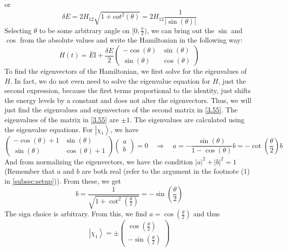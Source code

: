 \documentclass[12pt,a4paper]{article}
\begin{document}
	or
	\begin{equation}
		\delta E = 2H_{12} \sqrt{1 + cot^{2}(\theta)} = 2H_{12} \dfrac{1}{\left| \sin(\theta) \right|}
	\end{equation}
	Selecting $\theta$ to be some arbitrary angle on $[0, \frac{\pi}{2})$, we can bring out the $\sin$ and $\cos$ from the absolute values and write the Hamiltonian in the following way:
	\begin{equation}
		H(t) = \bar{E} \mathbb{I} + \dfrac{\delta E}{2}
		\begin{pmatrix}
			-\cos(\theta) & \sin(\theta) \\
			\sin(\theta) & \cos(\theta)
		\end{pmatrix} \label{3.55}
	\end{equation}
	To find the eigenvectors of the Hamiltonian, we first solve for the eigenvalues of $H$. In fact, we do not even need to solve the eigenvalue equation for $H$, just the second expression, because the first terms proportional to the identity, just shifts the energy levels by a constant and does not alter the eigenvectors. Thus, we will just find the eigenvalues and eigenvectors of the second matrix in \eqref{3.55}. The eigenvalues of the matrix in \eqref{3.55} are $\pm 1$. The eigenvalues are calculated using the eigenvalue equations. For $\left| \chi_{1} \right\rangle$, we have
	\begin{equation}
		\begin{pmatrix}
			-\cos(\theta) + 1 & \sin(\theta) \\
			\sin(\theta) & \cos(\theta) + 1
		\end{pmatrix}
		\begin{pmatrix}
			a \\
			b
		\end{pmatrix}
		= 0 \quad \Rightarrow \quad a = -\dfrac{\sin(\theta)}{1 - \cos(\theta)} b = -\cot(\frac{\theta}{2}) b
	\end{equation}
	And from normalizing the eigenvectors, we have the condition $\left| a \right|^{2} + \left| b \right|^{2} = 1$ (Remember that $a$ and $b$ are both real (refer to the argument in the footnote (1) in \ref{subsec:setup})). From these, we get
	\begin{equation}
		b = \dfrac{1}{\sqrt{1 + \cot^{2}\left( \frac{\theta}{2}  \right)}} = -\sin(\frac{\theta}{2})
	\end{equation}
	The sign choice is arbitrary. From this, we find $a = \cos(\frac{\theta}{2})$ and thus
	\begin{equation}
		\left| \chi_{1} \right\rangle = \pm
		\begin{pmatrix}
			\cos(\frac{\theta}{2}) \\[5pt]
			-\sin(\frac{\theta}{2})
		\end{pmatrix}
	\end{equation}
\end{document}
